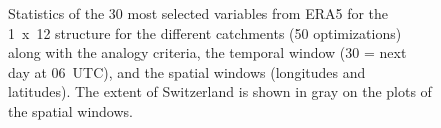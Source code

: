 \documentclass[draft]{agujournal2019}
\begin{document}
\begin{figure}[H]
	\noindent{}
	\caption{Statistics of the 30 most selected variables from ERA5 for the 1~x~12 structure for the different catchments (50 optimizations) along with the analogy criteria, the temporal window (30 = next day at 06~UTC), and the spatial windows (longitudes and latitudes). The extent of Switzerland is shown in gray on the plots of the spatial windows.}
	\label{fig_stats_params_era5}
\end{figure}

\end{document}
